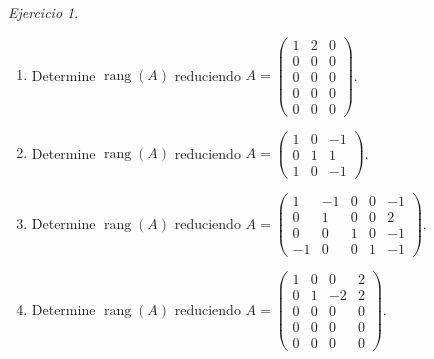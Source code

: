 \documentclass[12pt]{article}
\theoremstyle{remark}
\newtheorem{Ejer}[definicion]{Ejercicio}
\newcommand{\rang}{\operatorname{rang}}
\begin{document}
\begin{Ejer}
\begin{enumerate}[start=197]
\item Determine $\rang(A)$ reduciendo $A=\begin{pmatrix}1&2&0\\0&0&0\\0&0&0\\0&0&0\\0&0&0\end{pmatrix}$.

\item Determine $\rang(A)$ reduciendo $A=\begin{pmatrix}1&0&-1\\0&1&1\\1&0&-1\end{pmatrix}$.

\item Determine $\rang(A)$ reduciendo $A=\begin{pmatrix}1&-1&0&0&-1\\0&1&0&0&2\\0&0&1&0&-1\\-1&0&0&1&-1\end{pmatrix}$.

\item Determine $\rang(A)$ reduciendo $A=\begin{pmatrix}1&0&0&2\\0&1&-2&2\\0&0&0&0\\0&0&0&0\\0&0&0&0\end{pmatrix}$.
\end{enumerate}
\end{Ejer}
\end{document}
